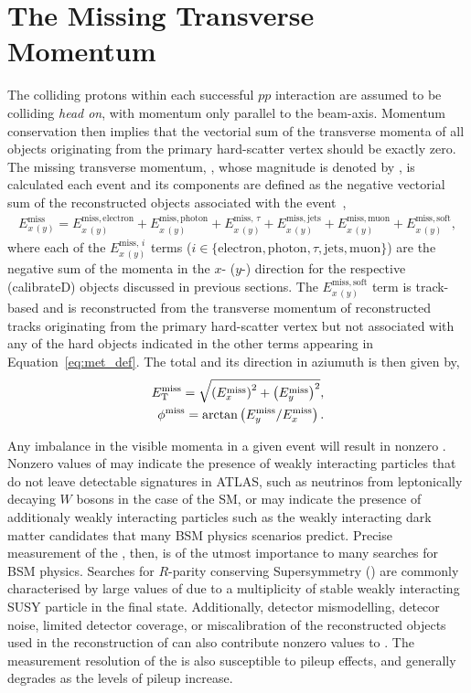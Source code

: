 \section{The Missing Transverse Momentum}
\label{sec:met}

The colliding protons within each successful $pp$ interaction are assumed to be colliding
\textit{head on}, with momentum only parallel to the beam-axis.
Momentum conservation then implies that the vectorial sum of the transverse momenta of all objects
originating from the primary hard-scatter vertex should be exactly zero.
The missing transverse momentum, \ptmiss, whose magnitude is denoted by \met, is calculated
each event and its components are defined as the negative vectorial sum of the
reconstructed objects associated with the event~\cite{METPaper},
\begin{align}
    E_{x\,(y)}^{\text{miss}} = E_{x\,(y)}^{\text{miss},\,\text{electron}} + E_{x\,(y)}^{\text{miss},\,\text{photon}} + E_{x\,(y)}^{\text{miss},\,\tau} + E_{x\,(y)}^{\text{miss},\,\text{jets}} + E_{x\,(y)}^{\text{miss},\,\text{muon}} + E_{x\,(y)}^{\text{miss},\,\text{soft}},
    \label{eq:met_def}
\end{align}
where each of the $E_{x\,(y)}^{\text{miss},\,i}$ terms ($i \in \{ \text{electron}, \text{photon}, \tau, \text{jets}, \text{muon} \}$)
are the negative sum of the momenta in the $x$- ($y$-) direction for the respective (calibrateD) objects discussed in previous sections.
The $E_{x\,(y)}^{\text{miss},\,\text{soft}}$ term is track-based and is reconstructed from the transverse momentum of 
reconstructed tracks originating from the primary hard-scatter vertex but not associated with any of the
hard objects indicated in the other terms appearing in Equation~\ref{eq:met_def}.
The total \met and its direction in aziumuth is then given by,
\begin{align}
    E_{\text{T}}^{\text{miss}} = \sqrt{ \left(E_x^{\text{miss}} \right)^2 + \left( E_y^{\text{miss}} \right)^2 }, \\
    \phi^{\text{miss}} = \arctan \left( E_y^{\text{miss}} / E_x^{\text{miss}} \right).
\end{align}

Any imbalance in the visible momenta in a given event will result in nonzero \met.
Nonzero values of \met may indicate the presence of weakly interacting particles that do not leave
detectable signatures in ATLAS, such as neutrinos from leptonically decaying $W$ bosons
in the case of the SM, or may indicate the presence of additionaly weakly interacting particles
such as the weakly interacting dark matter candidates that many BSM physics scenarios predict.
Precise measurement of the \met, then, is of the utmost importance to many searches for BSM physics.
Searches for $R$-parity conserving Supersymmetry ({\color{red}{Section XXX}}) are commonly characterised
by large values of \met due to a multiplicity of stable weakly interacting SUSY particle in the final state.
Additionally, detector mismodelling, detecor noise, limited detector coverage, or miscalibration of the reconstructed objects used in the reconstruction
of \ptmiss can also contribute nonzero values to \met.
The measurement resolution of the \met is also susceptible to pileup effects, and generally
degrades as the levels of pileup increase.
